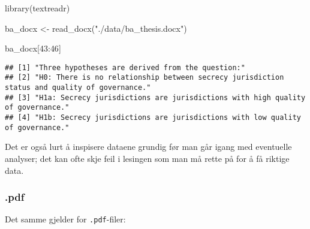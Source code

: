 \documentclass[
]{article}
\newenvironment{Shaded}{\begin{snugshade}}{\end{snugshade}}
\newcommand{\DecValTok}[1]{\textcolor[rgb]{0.00,0.00,0.81}{#1}}
\newcommand{\FunctionTok}[1]{\textcolor[rgb]{0.00,0.00,0.00}{#1}}
\newcommand{\NormalTok}[1]{#1}
\newcommand{\OtherTok}[1]{\textcolor[rgb]{0.56,0.35,0.01}{#1}}
\newcommand{\SpecialCharTok}[1]{\textcolor[rgb]{0.00,0.00,0.00}{#1}}
\newcommand{\StringTok}[1]{\textcolor[rgb]{0.31,0.60,0.02}{#1}}
\begin{document}
\begin{Shaded}
\begin{Highlighting}[]
\FunctionTok{library}\NormalTok{(textreadr)}

\NormalTok{ba\_docx }\OtherTok{\textless{}{-}} \FunctionTok{read\_docx}\NormalTok{(}\StringTok{"./data/ba\_thesis.docx"}\NormalTok{)}

\NormalTok{ba\_docx[}\DecValTok{43}\SpecialCharTok{:}\DecValTok{46}\NormalTok{]}
\end{Highlighting}
\end{Shaded}

\begin{verbatim}
## [1] "Three hypotheses are derived from the question:"                                            
## [2] "H0: There is no relationship between secrecy jurisdiction status and quality of governance."
## [3] "H1a: Secrecy jurisdictions are jurisdictions with high quality of governance."              
## [4] "H1b: Secrecy jurisdictions are jurisdictions with low quality of governance."
\end{verbatim}

Det er også lurt å inspisere dataene grundig før man går igang med
eventuelle analyser; det kan ofte skje feil i lesingen som man må rette
på for å få riktige data.

\hypertarget{pdf}{%
\subsubsection{.pdf}\label{pdf}}

Det samme gjelder for \texttt{.pdf}-filer:

\begin{Shaded}
\end{Shaded}
\end{document}

